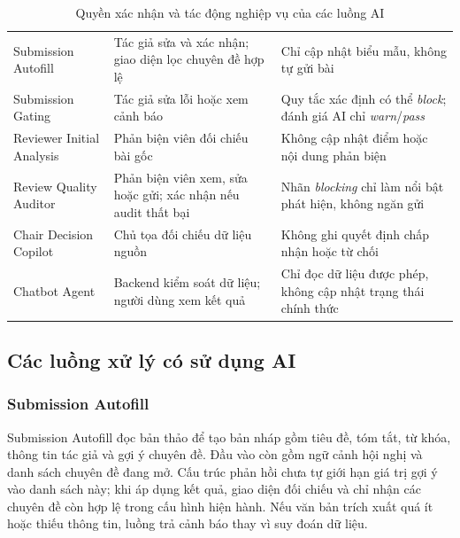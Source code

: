 \begin{table}[H]
  \centering
  \caption{Quyền xác nhận và tác động nghiệp vụ của các luồng AI}
  \label{tab:ch3-ai-authority-cut}
  \setlength{\tabcolsep}{3pt}
  \renewcommand{\arraystretch}{1.15}
  \begin{tabularx}{\textwidth}{|P{0.20\textwidth}|Y|Y|}
    \hline
     &  &  \\ \hline
    Submission Autofill & Tác giả sửa và xác nhận; giao diện lọc chuyên đề hợp lệ & Chỉ cập nhật biểu mẫu, không tự gửi bài \\ \hline
    Submission Gating & Tác giả sửa lỗi hoặc xem cảnh báo & Quy tắc xác định có thể \textit{block}; đánh giá AI chỉ \textit{warn}/\textit{pass} \\ \hline
    Reviewer Initial Analysis & Phản biện viên đối chiếu bài gốc & Không cập nhật điểm hoặc nội dung phản biện \\ \hline
    Review Quality Auditor & Phản biện viên xem, sửa hoặc gửi; xác nhận nếu audit thất bại & Nhãn \textit{blocking} chỉ làm nổi bật phát hiện, không ngăn gửi \\ \hline
    Chair Decision Copilot & Chủ tọa đối chiếu dữ liệu nguồn & Không ghi quyết định chấp nhận hoặc từ chối \\ \hline
    Chatbot Agent & Backend kiểm soát dữ liệu; người dùng xem kết quả & Chỉ đọc dữ liệu được phép, không cập nhật trạng thái chính thức \\ \hline
  \end{tabularx}
\end{table}

\subsection{Các luồng xử lý có sử dụng AI}
\label{subsec:ch3-ai-workflows-cut}

\subsubsection{Submission Autofill}

Submission Autofill đọc bản thảo để tạo bản nháp gồm tiêu đề, tóm tắt, từ khóa, thông tin tác giả và gợi ý chuyên đề. Đầu vào còn gồm ngữ cảnh hội nghị và danh sách chuyên đề đang mở. Cấu trúc phản hồi chưa tự giới hạn giá trị gợi ý vào danh sách này; khi áp dụng kết quả, giao diện đối chiếu và chỉ nhận các chuyên đề còn hợp lệ trong cấu hình hiện hành. Nếu văn bản trích xuất quá ít hoặc thiếu thông tin, luồng trả cảnh báo thay vì suy đoán dữ liệu.


